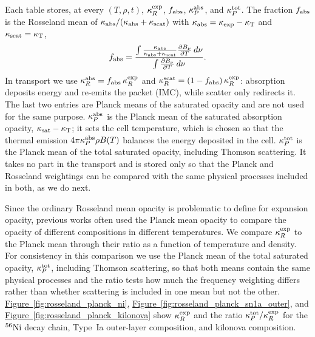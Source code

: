 \documentclass[final,5p,times,twocolumn]{elsarticle}
\DeclareRobustCommand{\figref}[1]{\hyperref[#1]{Figure~\ref*{#1}}}
\begin{document}
    Each table stores, at every $(T,\rho,t)$, $\kappa_R^{\rm exp}$, $f_{\rm abs}$,
    $\kappa_P^{\rm abs}$, and $\kappa_P^{\rm tot}$.
    The fraction $f_{\rm abs}$ is the Rosseland mean of
    $\kappa_{\rm abs}/(\kappa_{\rm abs}+\kappa_{\rm scat})$ with
    $\kappa_{\rm abs}=\kappa_{\rm exp}-\kappa_{\rm T}$ and $\kappa_{\rm scat}=\kappa_{\rm T}$,
    \begin{equation}
        f_{\rm abs} =
        \frac{\int \frac{\kappa_{\rm abs}}{\kappa_{\rm abs}+\kappa_{\rm scat}}
        \frac{\partial B_\nu}{\partial T}\,d\nu}
        {\int \frac{\partial B_\nu}{\partial T}\,d\nu}.
    \end{equation}
    In transport we use $\kappa_R^{\rm abs}=f_{\rm abs}\,\kappa_R^{\rm exp}$ and
    $\kappa_R^{\rm scat}=(1-f_{\rm abs})\,\kappa_R^{\rm exp}$: absorption deposits energy and
    re-emits the packet (IMC), while scatter only redirects it.
    The last two entries are Planck means of the saturated opacity and are not used for the same
    purpose. $\kappa_P^{\rm abs}$ is the Planck mean of the saturated absorption opacity,
    $\kappa_{\rm sat}-\kappa_{\rm T}$; it sets the cell temperature, which is chosen so that the
    thermal emission $4\pi\kappa_P^{\rm abs}\rho B(T)$ balances the energy deposited in the cell.
    $\kappa_P^{\rm tot}$ is the Planck mean of the total saturated opacity, including Thomson
    scattering. It takes no part in the transport and is stored only so that the Planck and
    Rosseland weightings can be compared with the same physical processes included in both,
    as we do next.

    Since the ordinary Rosseland mean opacity is problematic to define for expansion opacity, previous works
    \cite{deprince2024kilonova,just2022properties,tanaka2020systematic} often
    used the Planck mean opacity to compare the opacity of different compositions in different temperatures.
    We compare $\kappa_R^{\rm exp}$ to the Planck mean through their
    ratio as a function of temperature and density.
    For consistency in this comparison we use the Planck mean of the total saturated opacity,
    $\kappa_P^{\rm tot}$, including Thomson scattering, so that both means contain the same physical
    processes and the ratio tests how much the frequency weighting differs rather than whether
    scattering is included in one mean but not the other.
    \figref{fig:rosseland_planck_ni},
    \figref{fig:rosseland_planck_sn1a_outer}, and \figref{fig:rosseland_planck_kilonova}
    show $\kappa_R^{\rm exp}$ and the ratio $\kappa_P^{\rm tot}/\kappa_R^{\rm exp}$ for
    the $^{56}{\rm Ni}$ decay chain, Type~Ia outer-layer composition, and kilonova composition.
\end{document}
